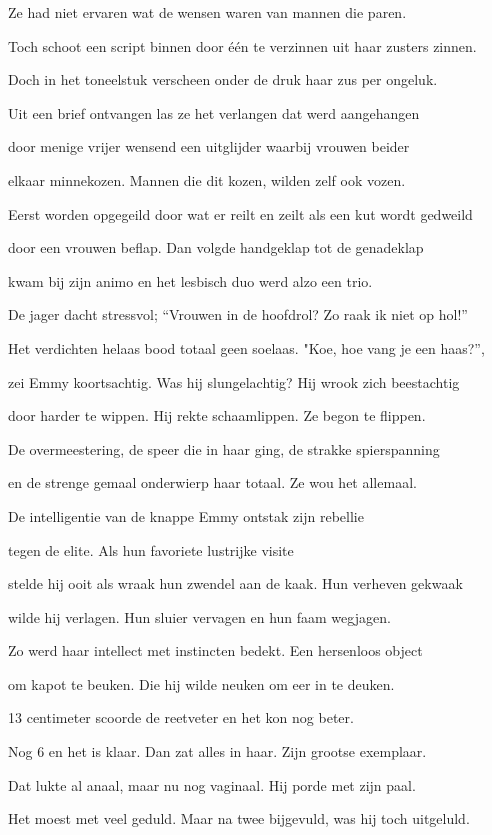Ze had niet ervaren
wat de wensen waren
van mannen die paren.

Toch schoot een script binnen
door één te verzinnen
uit haar zusters zinnen.

Doch in het toneelstuk
verscheen onder de druk
haar zus per ongeluk.

Uit een brief ontvangen
las ze het verlangen
dat werd aangehangen

door menige vrijer
wensend een uitglijder
waarbij vrouwen beider

elkaar minnekozen.
Mannen die dit kozen,
wilden zelf ook vozen.

Eerst worden opgegeild
door wat er reilt en zeilt
als een kut wordt gedweild

door een vrouwen beflap.
Dan volgde handgeklap
tot de genadeklap

kwam bij zijn animo
en het lesbisch duo
werd alzo een trio.

De jager dacht stressvol;
“Vrouwen in de hoofdrol?
Zo raak ik niet op hol!”

Het verdichten helaas
bood totaal geen soelaas.
"Koe, hoe vang je een haas?”,

zei Emmy koortsachtig.
Was hij slungelachtig?
Hij wrook zich beestachtig

door harder te wippen.
Hij rekte schaamlippen.
Ze begon te flippen.

De overmeestering,
de speer die in haar ging,
de strakke spierspanning

en de strenge gemaal
onderwierp haar totaal.
Ze wou het allemaal.

De intelligentie
van de knappe Emmy
ontstak zijn rebellie

tegen de elite.
Als hun favoriete
lustrijke visite

stelde hij ooit als wraak
hun zwendel aan de kaak.
Hun verheven gekwaak

wilde hij verlagen.
Hun sluier vervagen
en hun faam wegjagen.

Zo werd haar intellect
met instincten bedekt.
Een hersenloos object

om kapot te beuken.
Die hij wilde neuken
om eer in te deuken.

13 centimeter
scoorde de reetveter
en het kon nog beter.

Nog 6 en het is klaar.
Dan zat alles in haar.
Zijn grootse exemplaar.

Dat lukte al anaal,
maar nu nog vaginaal.
Hij porde met zijn paal.

Het moest met veel geduld.
Maar na twee bijgevuld,
was hij toch uitgeluld.

